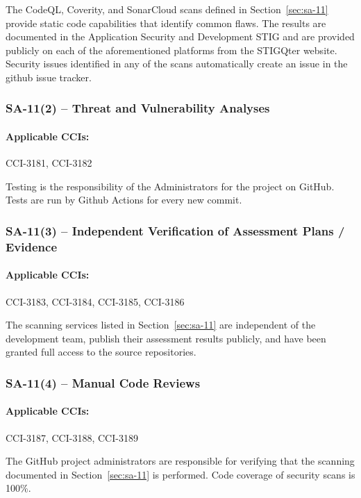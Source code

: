 \documentclass[letterpaper, 10pt, twoside]{article}
\begin{document}
The CodeQL, Coverity, and SonarCloud scans defined in Section~\ref{sec:sa-11} provide static code capabilities that identify common flaws. The results are documented in the Application Security and Development STIG and are provided publicly on each of the aforementioned platforms from the STIGQter website. Security issues identified in any of the scans automatically create an issue in the github issue tracker.

\subsubsection{SA-11(2) -- Threat and Vulnerability Analyses}

\paragraph{Applicable CCIs:} CCI-3181, CCI-3182

Testing is the responsibility of the Administrators for the project on GitHub. Tests are run by Github Actions for every new commit.

\subsubsection{SA-11(3) -- Independent Verification of Assessment Plans / Evidence}

\paragraph{Applicable CCIs:} CCI-3183, CCI-3184, CCI-3185, CCI-3186

The scanning services listed in Section~\ref{sec:sa-11} are independent of the development team, publish their assessment results publicly, and have been granted full access to the source repositories.

\subsubsection{SA-11(4) -- Manual Code Reviews}

\paragraph{Applicable CCIs:} CCI-3187, CCI-3188, CCI-3189

The GitHub project administrators are responsible for verifying that the scanning documented in Section~\ref{sec:sa-11} is performed. Code coverage of security scans is 100\%.
\end{document}
